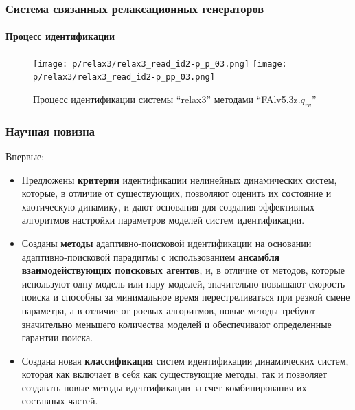 \documentclass[10pt,utf8]{beamer}
\begin{document}

\begin{frame}
  \frametitle{Система связанных релаксационных генераторов}
  \framesubtitle{Процесс идентификации}

  \begin{figure}[ht!]
    \centerline{
      \texttt{[image: p/relax3/relax3\_read\_id2-p\_p\_03.png]}
      \texttt{[image: p/relax3/relax3\_read\_id2-p\_pp\_03.png]}
      \hfill
    }
    \caption{Процесс идентификации системы ``relax3'' методами ``FAlv5.3z.$q_{rv}$'' }
    \label{atu:f:relax3_id0}
  \end{figure}

\end{frame}




\begin{frame}
  \frametitle{Научная новизна}

  \noindent
  Впервые:

  \begin{itemize}

    \item
      Предложены \textbf{критерии} идентификации нелинейных динамических систем, которые, в
      отличие от существующих, позволяют оценить их состояние и хаотическую динамику,
      и дают основания для создания эффективных алгоритмов настройки параметров
      моделей систем идентификации.

    \item
      Созданы \textbf{методы} адаптивно-поисковой идентификации на основании
      адаптивно-поисковой парадигмы с использованием \textbf{ансамбля взаимодействующих поисковых агентов},
      и, в отличие от методов, которые
      используют одну модель или пару моделей, значительно повышают скорость поиска и
      способны за минимальное время перестреливаться при резкой смене параметра, а в
      отличие от роевых алгоритмов, новые методы требуют значительно меньшего
      количества моделей и обеспечивают определенные гарантии поиска.

    \item
      Создана новая \textbf{классификация} систем идентификации динамических систем, которая
      как включает в себя как существующие методы, так и позволяет создавать новые методы
      идентификации за счет комбинирования их составных частей.

  \end{itemize}


\end{frame}
\end{document}

